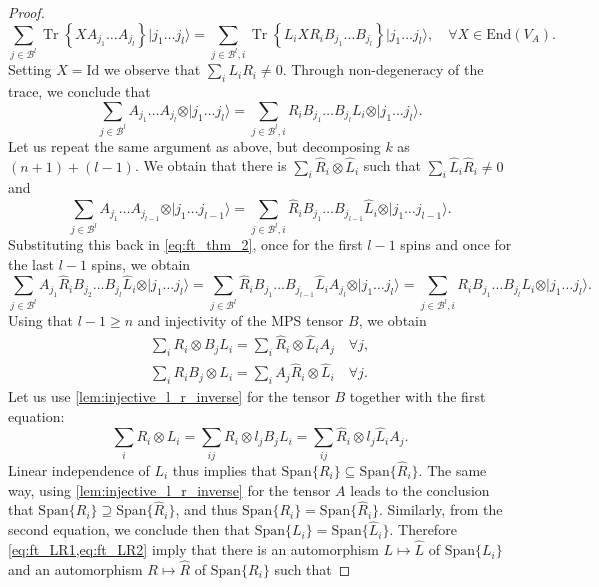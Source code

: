 \documentclass{article}
\newcommand{\tr}{\operatorname{Tr}}
\newcommand{\id}{\mathrm{Id}}
\newcommand{\End}{\mathrm{End}}
\newcommand{\ket}[1]{\vert #1 \rangle}
\newcommand{\Span}{\mathrm{Span}}
\begin{document}
\begin{proof}
  \begin{equation*}
    \sum_{j\in\mathcal{B}^l} \tr\left\{X A_{j_1} \dots A_{j_l}\right\} \ket{j_1 \dots j_l}= 
    \sum_{j\in\mathcal{B}^l,i} \tr\left\{L_i X R_i B_{j_1} \dots B_{j_l}\right\} \ket{j_1 \dots j_l}, \quad \forall X\in \End(V_A).
  \end{equation*}
  Setting $X=\id$ we observe that $\sum_i L_i R_i\neq 0$. Through non-degeneracy of the trace, we conclude that
  \begin{equation}\label{eq:ft_thm_2}
    \sum_{j\in\mathcal{B}^l}  A_{j_1} \dots A_{j_l} \otimes  \ket{j_1 \dots j_l}= 
    \sum_{j\in\mathcal{B}^l,i}  R_i B_{j_1} \dots B_{j_l}L_i \otimes \ket{j_1 \dots j_l}.
  \end{equation}
  Let us repeat the same argument as above, but decomposing $k$ as $(n+1)+(l-1)$. We obtain that there is $\sum_i \hat R_i \otimes \hat L_i$ such that $\sum_i \hat L_i \hat R_i \neq 0$ and    
  \begin{equation*}
    \sum_{j\in\mathcal{B}^l}  A_{j_1} \dots A_{j_{l-1}} \otimes  \ket{j_1 \dots j_{l-1}}= 
    \sum_{j\in\mathcal{B}^l,i}  \hat R_i B_{j_1} \dots  B_{j_{l-1}} \hat L_i \otimes \ket{j_1 \dots j_{l-1}}.
  \end{equation*}
  Substituting this back in \cref{eq:ft_thm_2}, once for the first $l-1$ spins and once for the last $l-1$ spins, we obtain
  \begin{equation*}
      \sum_{j\in\mathcal{B}^l}  A_{j_1} \hat R_i B_{j_2} \dots B_{j_l} \hat L_i  \otimes  \ket{j_1 \dots j_l}= 
    \sum_{j\in\mathcal{B}^l}  \hat R_i B_{j_1} \dots B_{j_{l-1}} \hat L_i A_{j_l} \otimes  \ket{j_1 \dots j_l}= 
      \sum_{j\in\mathcal{B}^l,i}  R_i B_{j_1} \dots B_{j_l}L_i \otimes \ket{j_1 \dots j_l}.
  \end{equation*}
  Using that $l-1\geq n$ and injectivity of the MPS tensor $B$, we obtain
  \begin{align}
    \sum_i R_i \otimes B_j L_i = \sum_i \hat R_i \otimes \hat L_i A_j \quad \forall j, \label{eq:ft_LR1}\\
    \sum_i R_i B_j \otimes L_i = \sum_i A_j \hat R_i \otimes \hat L_i \quad \forall j \label{eq:ft_LR2}.
  \end{align}
  Let us use \cref{lem:injective_l_r_inverse} for the tensor $B$ together with the first equation:
  \begin{equation*}
     \sum_{i} R_i \otimes L_i =  \sum_{ij} R_i \otimes l_jB_j L_i = \sum_{ij} \hat R_i \otimes l_j\hat L_i A_j.
  \end{equation*}
  Linear independence of $L_i$ thus implies that $\Span\{R_i\} \subseteq \Span\{\hat R_i\}$. The same way, using \cref{lem:injective_l_r_inverse} for the tensor $A$  leads to the conclusion that $\Span\{R_i\} \supseteq \Span\{\hat R_i\}$, and thus $\Span\{R_i\} = \Span\{\hat R_i\}$. Similarly, from the second equation, we conclude then that $\Span\{L_i\} = \Span\{\hat L_i\}$. Therefore \cref{eq:ft_LR1,eq:ft_LR2} imply that there is an automorphism $L\mapsto \hat{L}$ of $\Span\{L_i\}$ and an automorphism $R\mapsto \hat{R}$ of $\Span\{R_i\}$ such that 

\end{proof}
\end{document}
